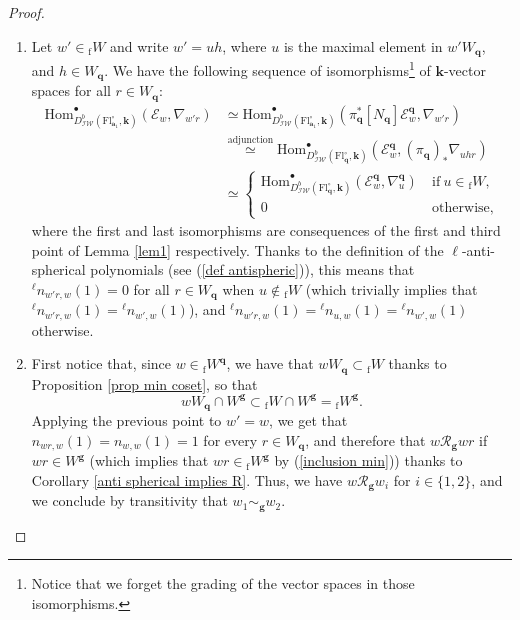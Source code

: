 \documentclass[11pt]{amsart}
\theoremstyle{plain}
\theoremstyle{remark}
\numberwithin{equation}{section}
\begin{document}
	\begin{proof}
		\begin{enumerate}
			\item Let $w'\in {_\mathrm{f}W}$ and write $w'=uh$, where $u$ is the maximal element in $w'W_\mathbf{q}$, and $h\in W_\mathbf{q}$. We have the following sequence of isomorphisms\footnote{Notice that we forget the grading of the vector spaces in those isomorphisms.} of $\mathbf{k}$-vector spaces for all $r\in W_\mathbf{q}$:
			\begin{align*}
				\mathrm{Hom}^\bullet_{D^b_{\mathcal{IW}}(\mathrm{Fl}^{\circ}_{\mathbf{a}_1},\mathbf{k})}(\mathcal{E}_{w},\nabla_{w'r})&\simeq \mathrm{Hom}^\bullet_{D^b_{\mathcal{IW}}(\mathrm{Fl}^{\circ}_{\mathbf{a}_1},\mathbf{k})}(\pi_{\mathbf{q}}^*[N_\mathbf{q}]\mathcal{E}_{w}^{\mathbf{q}},\nabla_{w'r})\\
				&\overset{\text{adjunction}}{\simeq} \mathrm{Hom}^\bullet_{D^b_{\mathcal{IW}}(\mathrm{Fl}^{\circ}_{\mathbf{q}},\mathbf{k})}(\mathcal{E}_{w}^{\mathbf{q}},(\pi_\mathbf{q})_*\nabla_{uhr})\\
				&\simeq \begin{cases}\mathrm{Hom}^\bullet_{D^b_{\mathcal{IW}}(\mathrm{Fl}^{\circ}_{\mathbf{q}},\mathbf{k})}(\mathcal{E}_{w}^{\mathbf{q}},\nabla_{u}^{\mathbf{q}})~&\text{if}~u\in {_\mathrm{f}W},\\
					0~&\text{otherwise},
				\end{cases}
			\end{align*}
			where the first and last isomorphisms are consequences of the first and third point of Lemma \ref{lem1} respectively. Thanks to the definition of the $\ell$-anti-spherical polynomials (see (\ref{def antispheric})), this means that ${^\ell n}_{w'r,w}(1)=0$ for all $r\in W_\mathbf{q}$ when $u\notin {_\mathrm{f}W}$ (which trivially implies that ${^\ell n}_{w'r,w}(1)={^\ell n}_{w',w}(1)$), and ${^\ell n}_{w'r,w}(1)={^\ell n}_{u,w}(1)={^\ell n}_{w',w}(1)$ otherwise.
			\item First notice that, since $w\in {_{\mathrm{f}}W}^\mathbf{q}$, we have that $wW_\mathbf{q}\subset {_{\mathrm{f}}W}$ thanks to Proposition \ref{prop min coset}, so that \begin{equation}\label{inclusion min}
			    wW_\mathbf{q}\cap W^{\mathbf{g}}\subset {_{\mathrm{f}}W}\cap W^{\mathbf{g}}={_{\mathrm{f}}W}^\mathbf{g}.
			\end{equation} Applying the previous point to $w'=w$, we get that ${ n}_{wr,w}(1)={ n}_{w,w}(1)=1$ for every $r\in W_\mathbf{q}$, and therefore that $w\mathscr{R}_\mathbf{g}wr$ if  $wr\in W^{\mathbf{g}}$ (which implies that $wr\in {_{\mathrm{f}}W}^\mathbf{g}$ by (\ref{inclusion min})) thanks to Corollary \ref{anti spherical implies R}. Thus, we have $w\mathscr{R}_\mathbf{g}w_i$ for $i\in\{1,2\}$, and we conclude by transitivity that $w_1\sim_{\mathbf{{g}}}w_2$.
		\end{enumerate}
	\end{proof} 
\end{document}
